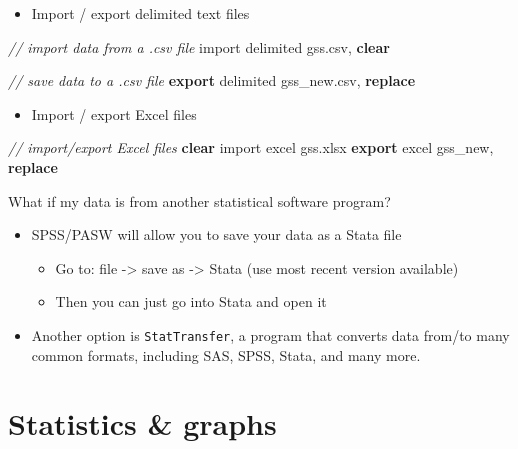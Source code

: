 \documentclass[
]{book}
\newenvironment{Shaded}{\begin{snugshade}}{\end{snugshade}}
\newcommand{\CommentTok}[1]{\textcolor[rgb]{0.56,0.35,0.01}{\textit{#1}}}
\newcommand{\KeywordTok}[1]{\textcolor[rgb]{0.13,0.29,0.53}{\textbf{#1}}}
\newcommand{\NormalTok}[1]{#1}
\providecommand{\tightlist}{%
  \setlength{\itemsep}{0pt}\setlength{\parskip}{0pt}}
\begin{document}
\begin{itemize}
\tightlist
\item
  Import / export delimited text files
\end{itemize}

\begin{Shaded}
\begin{Highlighting}[]
\CommentTok{// import data from a .csv file}
\NormalTok{import delimited gss.csv, }\KeywordTok{clear}

\CommentTok{// save data to a .csv file}
\KeywordTok{export}\NormalTok{ delimited gss\_new.csv, }\KeywordTok{replace}
\end{Highlighting}
\end{Shaded}

\begin{itemize}
\tightlist
\item
  Import / export Excel files
\end{itemize}

\begin{Shaded}
\begin{Highlighting}[]
\CommentTok{// import/export Excel files}
\KeywordTok{clear}
\NormalTok{import excel gss.xlsx}
\KeywordTok{export}\NormalTok{ excel gss\_new, }\KeywordTok{replace}
\end{Highlighting}
\end{Shaded}

What if my data is from another statistical software program?

\begin{itemize}
\tightlist
\item
  SPSS/PASW will allow you to save your data as a Stata file

  \begin{itemize}
  \tightlist
  \item
    Go to: file -\textgreater{} save as -\textgreater{} Stata (use most recent version available)
  \item
    Then you can just go into Stata and open it
  \end{itemize}
\item
  Another option is \texttt{StatTransfer}, a program that converts data from/to many common formats, including SAS, SPSS, Stata, and many more.
\end{itemize}

\hypertarget{statistics-graphs}{%
\section{Statistics \& graphs}\label{statistics-graphs}}
\end{document}
